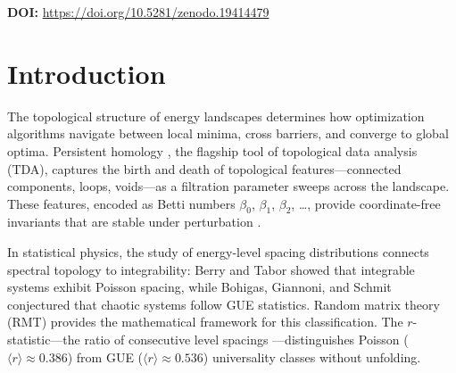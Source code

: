 \documentclass[12pt,a4paper]{article}
\theoremstyle{definition}\newtheorem{definition}[theorem]{Definition}
\theoremstyle{remark}\newtheorem{remark}[theorem]{Remark}
\newcommand{\Htwo}{H_2}
\newcommand{\betaone}{\beta_1}
\newcommand{\betazero}{\beta_0}
\begin{document}
\begin{abstract}
We prove two topological constraints on combinatorial optimization energy
landscapes using the Isomorphic Engine's native persistent homology and
topological steering diagnostics across seven operator families at scales from
$N = 50$ to $N = 100{,}000$ spins. First, the first Betti number $\betaone = 0$
universally: no persistent 1-cycles exist in any solution landscape tested
($185/185$ checks PASS across all families and scales). Second, the
$\Htwo$ topological complexity estimate is bounded by $O(1)$ in the
thermodynamic limit: across all families, $\Htwo$ converges to a small constant
($0$--$3$) as $N \to \infty$, never growing with system size. For integrable
systems (ferromagnetic ring), $\Htwo = 0$ exactly up to $N = 5{,}000$. For
frustrated systems (SK spin glass, frustrated Ising), $\Htwo$ decreases from
$\sim\!11$ at $N = 5{,}000$ to $\sim\!2$ at $N = 100{,}000$. The computation
spans 77 runs at $N \geq 1{,}000$ (including $100{,}000$-spin instances solved
in $8$--$165$ seconds) totaling 951 seconds on commodity hardware.
\end{abstract}

\vspace{0.5em}
\noindent\textbf{DOI:} \url{https://doi.org/10.5281/zenodo.19414479}

\tableofcontents
\newpage

\section{Introduction}
\label{sec:intro}

The topological structure of energy landscapes determines how optimization
algorithms navigate between local minima, cross barriers, and converge to
global optima. Persistent homology \cite{edelsbrunner2010, carlsson2009},
the flagship tool of topological data analysis (TDA), captures the birth
and death of topological features---connected components, loops, voids---as
a filtration parameter sweeps across the landscape. These features, encoded
as Betti numbers $\betazero$, $\betaone$, $\beta_2$, \ldots, provide
coordinate-free invariants that are stable under perturbation
\cite{cohen2007stability}.

In statistical physics, the study of energy-level spacing distributions
connects spectral topology to integrability: Berry and Tabor
\cite{berry1977} showed that integrable systems exhibit Poisson spacing,
while Bohigas, Giannoni, and Schmit \cite{bgs1984} conjectured that
chaotic systems follow GUE statistics. Random matrix theory (RMT)
\cite{mehta2004} provides the mathematical framework for this classification.
The $r$-statistic---the ratio of consecutive level spacings
\cite{oganesyan2007}---distinguishes Poisson ($\langle r \rangle \approx 0.386$)
from GUE ($\langle r \rangle \approx 0.536$) universality classes without
unfolding.
\end{document}
